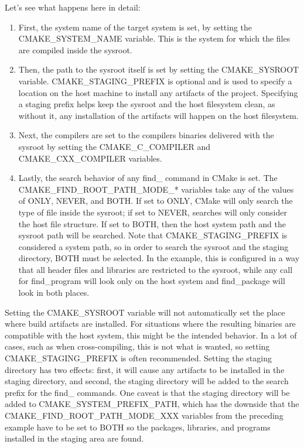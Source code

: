 Let's see what happens here in detail:

\begin{enumerate}
\item 
First, the system name of the target system is set, by setting the CMAKE\_SYSTEM\_NAME variable. This is the system for which the files are compiled inside the sysroot.

\item 
Then, the path to the sysroot itself is set by setting the CMAKE\_SYSROOT variable. CMAKE\_STAGING\_PREFIX is optional and is used to specify a location on the host machine to install any artifacts of the project. Specifying a staging prefix helps keep the sysroot and the host filesystem clean, as without it, any installation of the artifacts will happen on the host filesystem.

\item 
Next, the compilers are set to the compilers binaries delivered with the sysroot by setting the CMAKE\_C\_COMPILER and CMAKE\_CXX\_COMPILER variables.

\item 
Lastly, the search behavior of any find\_ command in CMake is set. The CMAKE\_FIND\_ROOT\_PATH\_MODE\_* variables take any of the values of ONLY, NEVER, and BOTH. If set to ONLY, CMake will only search the type of file inside the sysroot; if set to NEVER, searches will only consider the host file structure. If set to BOTH, then the host system path and the sysroot path will be searched. Note that CMAKE\_STAGING\_PREFIX is considered a system path, so in order to search the sysroot and the staging directory, BOTH must be selected. In the example, this is configured in a way that all header files and libraries are restricted to the sysroot, while any call for find\_program will look only on the host system and find\_package will look in both places.
\end{enumerate}

Setting the CMAKE\_SYSROOT variable will not automatically set the place where build artifacts are installed. For situations where the resulting binaries are compatible with the host system, this might be the intended behavior. In a lot of cases, such as when cross-compiling, this is not what is wanted, so setting CMAKE\_STAGING\_PREFIX is often recommended. Setting the staging directory has two effects: first, it will cause any artifacts to be installed in the staging directory, and second, the staging directory will be added to the search prefix for the find\_ commands. One caveat is that the staging directory will be added to CMAKE\_SYSTEM\_PREFIX\_PATH, which has the downside that the CMAKE\_FIND\_ROOT\_PATH\_MODE\_XXX variables from the preceding example have to be set to BOTH so the packages, libraries, and programs installed in the staging area are found.

